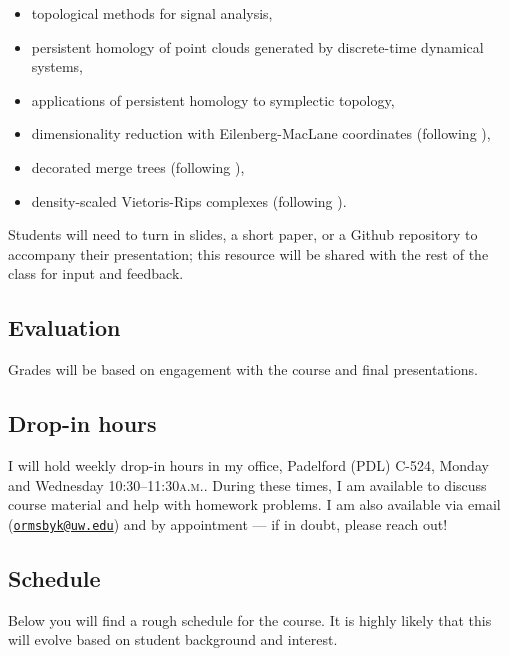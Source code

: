 \documentclass[11pt,twoside]{amsart}
\begin{document}
\begin{itemize}
\item topological methods for signal analysis,
\item persistent homology of point clouds generated by discrete-time dynamical systems,
\item applications of persistent homology to symplectic topology,
\item dimensionality reduction with {E}ilenberg-{M}ac{L}ane coordinates (following \cite{perea}),
\item decorated merge trees (following \cite{dmt}),
\item density-scaled Vietoris-Rips complexes (following \cite{hicock}).
\end{itemize}

\noindent Students will need to turn in slides, a short paper, or a Github repository to accompany their presentation; this resource will be shared with the rest of the class for input and feedback.

\subsection*{Evaluation}
Grades will be based on engagement with the course and final presentations.

\subsection*{Drop-in hours}
I will hold weekly drop-in hours in my office, Padelford (PDL) C-524, Monday and Wednesday 10:30--11:30\textsc{a.m.}. During these times, I am available to discuss course material and help with homework problems. I am also available via email (\href{mailto:ormsbyk@uw.edu}{\nolinkurl{ormsbyk@uw.edu}}) and by appointment --- if in doubt, please reach out!

\subsection*{Schedule}
Below you will find a rough schedule for the course. It is highly likely that this will evolve based on student background and interest.
\end{document}
